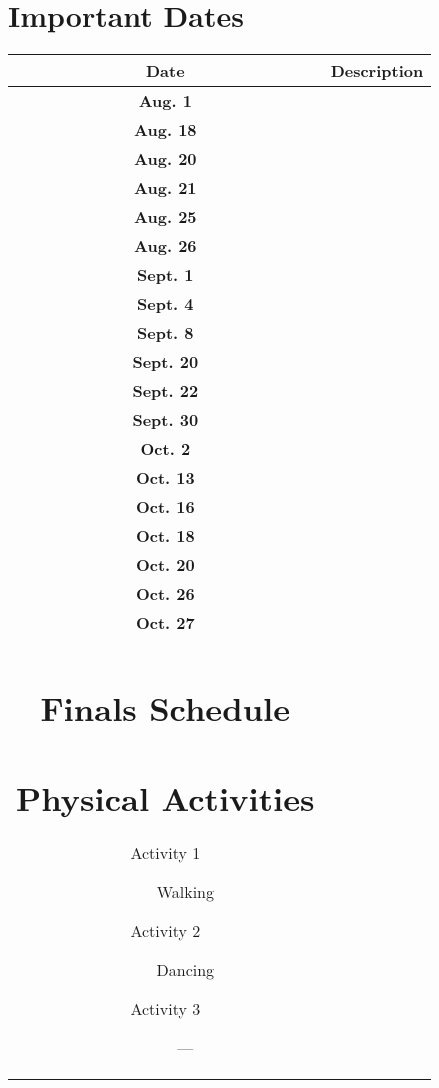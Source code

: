 \documentclass[10pt]{article}
\begin{document}
\pagebreak


\section*{Important Dates}
\label{sec:importantdates}

\begin{table}
	\begin{tabular}{ |c|c| }
		\hline
		\textbf{Date} & \textbf{Description} \\ \hline
		\textbf{Aug. 1} & \\ \hline
		\textbf{Aug. 18} & \\ \hline
		\textbf{Aug. 20} & \\ \hline
		\textbf{Aug. 21} & \\ \hline
		\textbf{Aug. 25} & \\ \hline
		\textbf{Aug. 26} & \\ \hline
		\textbf{Sept. 1} & \\ \hline
		\textbf{Sept. 4} & \\ \hline
		\textbf{Sept. 8} & \\ \hline
		\textbf{Sept. 20} & \\ \hline
		\textbf{Sept. 22} & \\ \hline
		\textbf{Sept. 30} & \\ \hline
		\textbf{Oct. 2} & \\ \hline
		\textbf{Oct. 13} & \\ \hline
		\textbf{Oct. 16} & \\ \hline
		\textbf{Oct. 18} & \\ \hline
		\textbf{Oct. 20} & \\ \hline
		\textbf{Oct. 26} & \\ \hline
		\textbf{Oct. 27} & \\ \hline

\section*{Finals Schedule}
\label{sec:finals}
\addcontentsline{toc}{section}{\nameref{sec:finals}}

\pagebreak

\section*{Physical Activities}
\label{sec:physical}
\addcontentsline{toc}{section}{\nameref{sec:physical}}
\begin{description}
\item [Activity 1] Walking
\item [Activity 2] Dancing
\item [Activity 3] ---
\end{description}


\end{tabular}
\end{table}
\end{document}
